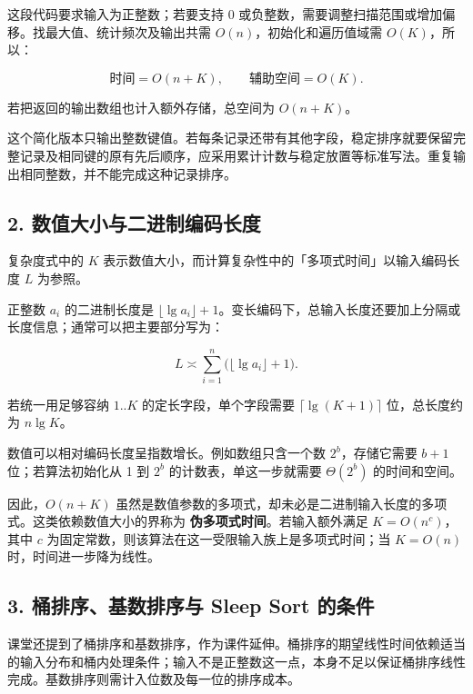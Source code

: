 \documentclass[
  UTF8,fontset=none,zihao=5]{ctexart}
\let\OldSubsection\subsection
\renewcommand{\subsection}{\Needspace{4\baselineskip}\OldSubsection}
\begin{document}
这段代码要求输入为正整数；若要支持 0
或负整数，需要调整扫描范围或增加偏移。找最大值、统计频次及输出共需
\(O(n)\)，初始化和遍历值域需 \(O(K)\)，所以：

\[
\text{时间}=O(n+K),\qquad
\text{辅助空间}=O(K).
\]

若把返回的输出数组也计入额外存储，总空间为 \(O(n+K)\)。

这个简化版本只输出整数键值。若每条记录还带有其他字段，稳定排序就要保留完整记录及相同键的原有先后顺序，应采用累计计数与稳定放置等标准写法。重复输出相同整数，并不能完成这种记录排序。

\hypertarget{ux6570ux503cux5927ux5c0fux4e0eux4e8cux8fdbux5236ux7f16ux7801ux957fux5ea6}{%
\subsection{2.
数值大小与二进制编码长度}\label{ux6570ux503cux5927ux5c0fux4e0eux4e8cux8fdbux5236ux7f16ux7801ux957fux5ea6}}

复杂度式中的 \(K\)
表示数值大小，而计算复杂性中的「多项式时间」以输入编码长度 \(L\)
为参照。

正整数 \(a_i\) 的二进制长度是
\(\lfloor\lg a_i\rfloor+1\)。变长编码下，总输入长度还要加上分隔或长度信息；通常可以把主要部分写为：

\[
L\asymp\sum_{i=1}^{n}
\bigl(\lfloor\lg a_i\rfloor+1\bigr).
\]

若统一用足够容纳 \(1..K\) 的定长字段，单个字段需要
\(\lceil\lg(K+1)\rceil\) 位，总长度约为 \(n\lg K\)。

数值可以相对编码长度呈指数增长。例如数组只含一个数 \(2^b\)，存储它需要
\(b+1\) 位；若算法初始化从 1 到 \(2^b\) 的计数表，单这一步就需要
\(\Theta(2^b)\) 的时间和空间。

因此，\(O(n+K)\)
虽然是数值参数的多项式，却未必是二进制输入长度的多项式。这类依赖数值大小的界称为
\textbf{伪多项式时间}。若输入额外满足 \(K=O(n^c)\)，其中 \(c\)
为固定常数，则该算法在这一受限输入族上是多项式时间；当 \(K=O(n)\)
时，时间进一步降为线性。

\hypertarget{ux6876ux6392ux5e8fux57faux6570ux6392ux5e8fux4e0e-sleep-sort-ux7684ux6761ux4ef6}{%
\subsection{3. 桶排序、基数排序与 Sleep Sort
的条件}\label{ux6876ux6392ux5e8fux57faux6570ux6392ux5e8fux4e0e-sleep-sort-ux7684ux6761ux4ef6}}

课堂还提到了桶排序和基数排序，作为课件延伸。桶排序的期望线性时间依赖适当的输入分布和桶内处理条件；输入不是正整数这一点，本身不足以保证桶排序线性完成。基数排序则需计入位数及每一位的排序成本。
\end{document}
